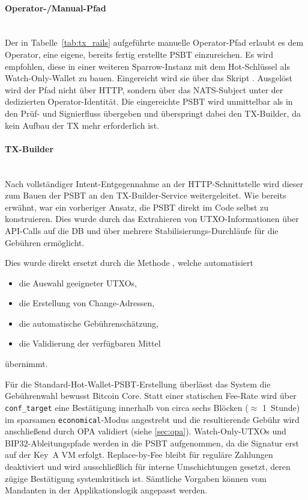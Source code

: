 \paragraph{Operator-/Manual-Pfad} \mbox{}\\
Der in Tabelle~\ref{tab:tx_rails} aufgeführte manuelle Operator-Pfad erlaubt es dem Operator, eine eigene, bereits fertig erstellte \ac{PSBT} einzureichen. Es wird empfohlen, diese in einer weiteren Sparrow-Instanz mit dem Hot-Schlüssel als Watch-Only-Wallet zu bauen. Eingereicht wird sie über das Skript . Ausgelöst wird der Pfad nicht über \ac{HTTP}, sondern über das \ac{NATS}-Subject \texttt{} unter der dedizierten Operator-Identität. Die eingereichte \ac{PSBT} wird unmittelbar als \texttt{} in den Prüf- und Signierfluss übergeben und überspringt dabei den TX-Builder, da kein Aufbau der \ac{TX} mehr erforderlich ist.

\paragraph{TX-Builder} \mbox{}\\
Nach vollständiger Intent-Entgegennahme an der \ac{HTTP}-Schnittstelle wird dieser zum Bauen der \ac{PSBT} an den TX-Builder-Service weitergeleitet.
Wie bereits erwähnt, war ein vorheriger Ansatz, die \ac{PSBT} direkt im Code selbst zu konstruieren. Dies wurde durch das Extrahieren von \ac{UTXO}-Informationen über \ac{API}-Calls auf die \ac{DB} und über mehrere Stabilisierungs-Durchläufe für die Gebühren ermöglicht.

Dies wurde direkt ersetzt durch die Methode  \cite{bitcoincore_walletcreatefundedpsbt}, welche automatisiert
\begin{itemize}
    \item die Auswahl geeigneter \acp{UTXO},
    \item die Erstellung von Change-Adressen,
    \item die automatische Gebührenschätzung,
    \item die Validierung der verfügbaren Mittel
\end{itemize}
übernimmt.

Für die Standard-Hot-Wallet-\ac{PSBT}-Erstellung überlässt das System die Gebührenwahl bewusst Bitcoin Core. 
Statt einer statischen Fee-Rate wird über
\texttt{conf\_target} eine Bestätigung innerhalb von circa sechs Blöcken ($\approx$ 1~Stunde) im sparsamen \texttt{economical}-Modus angestrebt und die
resultierende Gebühr wird anschließend durch \ac{OPA} validiert (siehe \ref{sec:opa}). 
Watch-Only-\acp{UTXO} und \ac{BIP}32-Ableitungspfade werden in die \ac{PSBT} aufgenommen, da die Signatur erst auf der Key~A \ac{VM} erfolgt.
Replace-by-Fee \cite{bip125} bleibt für reguläre Zahlungen deaktiviert und wird ausschließlich für interne Umschichtungen gesetzt, deren zügige Bestätigung systemkritisch ist. 
Sämtliche Vorgaben können vom Mandanten in der Applikationslogik angepasst werden.

